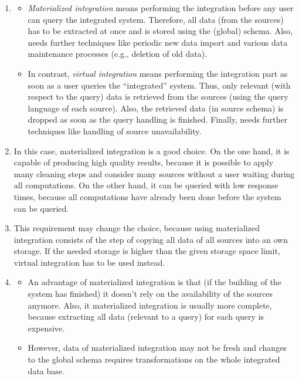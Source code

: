 \documentclass{scrartcl}
\begin{document}
	\begin{enumerate}
		\item\phantom{phantom}
		\begin{itemize}
			\item
			\textit{Materialized integration} means performing the integration before any user can query the integrated system.
			Therefore, all data (from the sources) has to be extracted at once and is stored using the (global) schema.
			Also, needs further techniques like periodic new data import and various data maintenance processes (e.g., deletion of old data).
			
			\item
			In contrast, \textit{virtual integration} means performing the integration part as soon as a user queries the \enquote{integrated} system.
			Thus, only relevant (with respect to the query) data is retrieved from the sources (using the query language of each source).
			Also, the retrieved data (in source schema) is dropped as soon as the query handling is finished.
			Finally, needs further techniques like handling of source unavailability.
		\end{itemize}
		
		\item
		In this case, materialized integration is a good choice.
		On the one hand, it is capable of producing high quality results, because it is possible to apply many cleaning steps and consider many sources without a user waiting during all computations.
		On the other hand, it can be queried with low response times, because all computations have already been done before the system can be queried.
		
		\item
		This requirement may change the choice, because using materialized integration consists of the step of copying all data of all sources into an own storage.
		If the needed storage is higher than the given storage space limit, virtual integration has to be used instead.
		
		\item\phantom{phantom}
		\begin{itemize}
			\item An advantage of materialized integration is that (if the building of the system has  finished) it doesn't rely on the availability of the sources anymore.
			Also, it materialized integration is usually more complete, because extracting all data (relevant to a query) for each query is expensive.
			
			\item However, data of materialized integration may not be fresh and changes to the global schema requires transformations on the whole integrated data base.
		\end{itemize}
	\end{enumerate}
	
\end{document}
